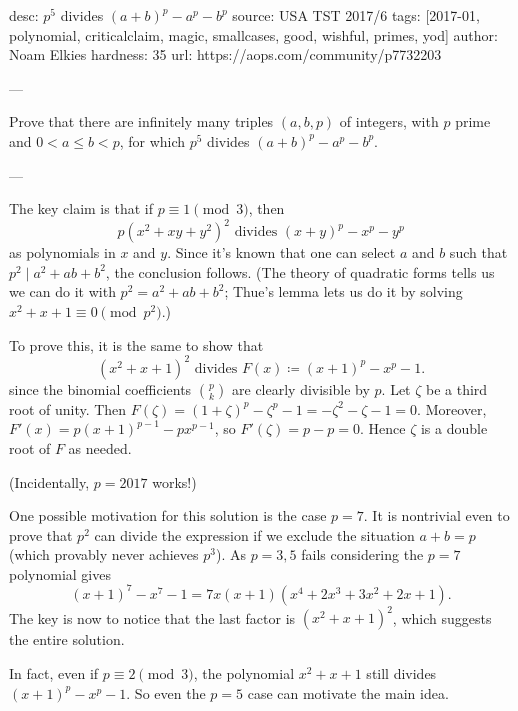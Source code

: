 desc: $p^5$ divides $(a+b)^p - a^p - b^p$
source: USA TST 2017/6
tags: [2017-01, polynomial, criticalclaim, magic, smallcases, good, wishful, primes, yod]
author: Noam Elkies
hardness: 35
url: https://aops.com/community/p7732203

---

Prove that there are infinitely many triples $(a,b,p)$ of integers,
with $p$ prime and $0 < a \le b < p$,
for which $p^5$ divides $(a+b)^p - a^p - b^p$.

---

The key claim is that if $p \equiv 1 \pmod 3$,
then
\[ p(x^2+xy+y^2)^2 \text{ divides } (x+y)^p - x^p - y^p \]
as polynomials in $x$ and $y$.
Since it's known that one can select $a$ and $b$ such that
$p^2 \mid a^2 + ab + b^2$, the conclusion follows.
(The theory of quadratic forms tells us we can do it with $p^2 = a^2+ab+b^2$;
Thue's lemma lets us do it by solving $x^2+x+1 \equiv 0 \pmod{p^2}$.)

To prove this, it is the same to show that
\[ (x^2+x+1)^2 \text{ divides } F(x) \coloneqq (x+1)^p - x^p - 1. \]
since the binomial coefficients $\binom pk$ are clearly divisible by $p$.
Let $\zeta$ be a third root of unity.
Then $F(\zeta) = (1+\zeta)^p - \zeta^p - 1 = -\zeta^2 - \zeta - 1 = 0$.
Moreover, $F'(x) = p(x+1)^{p-1} -  px^{p-1}$,
so $F'(\zeta) = p - p = 0$.
Hence $\zeta$ is a double root of $F$ as needed.

(Incidentally, $p = 2017$ works!)

\begin{remark*}
One possible motivation for this solution is the case $p = 7$.
It is nontrivial even to prove that $p^2$ can divide the expression
if we exclude the situation $a+b=p$ (which provably never achieves $p^3$).
As $p = 3, 5$ fails considering the $p = 7$ polynomial gives
\[ (x+1)^7 - x^7 - 1 = 7x(x+1) \left( x^4 + 2x^3 + 3x^2 + 2x + 1 \right). \]
The key is now to notice that the last factor is $(x^2+x+1)^2$,
which suggests the entire solution.

In fact, even if $p \equiv 2 \pmod 3$,
the polynomial $x^2+x+1$ still divides $(x+1)^p-x^p-1$.
So even the $p = 5$ case can motivate the main idea.
\end{remark*}
